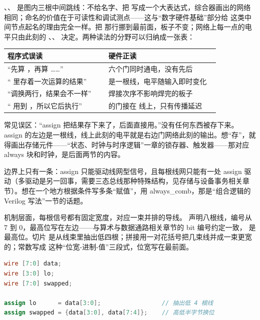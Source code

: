 、、 是图内三根中间跳线：不给名字、把  写成一个大表达式，综合器画出的网络相同；命名的价值在于可读性和调试测点——这与“数字硬件基础”部分给  这类中间节点起名的理由完全一样。把  那行挪到最前面，板子不变；网络上每一点的电平只由此刻的 、、 决定。两种读法的分野可以归纳成一张表：

\begin{longtable}{L{0.4\linewidth}L{0.44\linewidth}}
\toprule
程序式误读 & 硬件正读 \\
\midrule
“先算 ，再算 ……” & 六个门同时通电，没有先后 \\\tablerowrule
“ 里存着一次运算的结果” &  是一根线，电平随输入即时变化 \\\tablerowrule
“调换两行，结果会不一样” & 焊接次序不影响焊完的板子 \\\tablerowrule
“ 用到 ，所以它后执行” &  的门接在  线上，只有传播延迟 \\
\bottomrule
\end{longtable}

\begin{warningbox}
常见误区：“assign 把结果存下来了，后面直接用。”没有任何东西被存下来。assign 的左边是一根线，线上此刻的电平就是右边门网络此刻的输出。想“存”，就得画出存储元件——“状态、时钟与时序逻辑”一章的锁存器、触发器——那对应 always 块和时钟，是后面两节的内容。
\end{warningbox}

边界上只有一条：assign 只能驱动线网型信号，且每根线网只能有一处 assign 驱动（多驱动是另一回事，需要三态总线那种特殊结构，见存储与设备事务相关章节）。想在一个地方根据条件写多条“赋值”，用 always\_comb，那是“组合逻辑的 Verilog 写法”一节的话题。

机制层面，每根信号都有固定宽度，对应一束并排的导线。 声明八根线，编号从 7 到 0，最高位写在左边——与算术与数据通路相关章节的 bit 编号约定一致， 是最高位。切片  是从线束里抽出低四根；拼接用一对花括号把几束线并成一束更宽的；常数写成  这种“位宽-进制-值”三段式，位宽写在最前面。

\begin{lstlisting}[language=Verilog]
wire [7:0] data;
wire [3:0] lo;
wire [7:0] swapped;

assign lo      = data[3:0];                 // 抽出低 4 根线
assign swapped = {data[3:0], data[7:4]};    // 高低半字节换位
\end{lstlisting}

